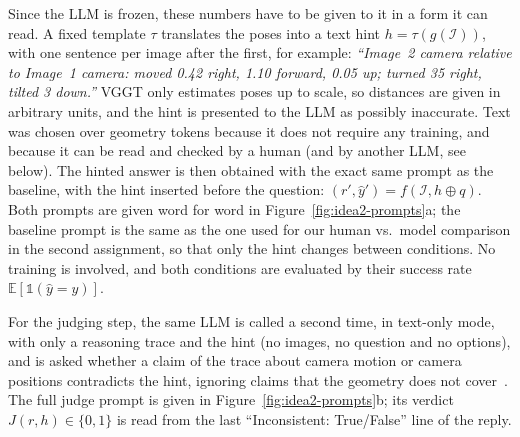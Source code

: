 Since the LLM is frozen, these numbers have to be given to it in a form it can read. A fixed template $\tau$ translates the poses into a text hint $h=\tau(g(\mathcal{I}))$, with one sentence per image after the first, for example: \emph{``Image~2 camera relative to Image~1 camera: moved 0.42 right, 1.10 forward, 0.05 up; turned 35\textdegree{} right, tilted 3\textdegree{} down.''} VGGT only estimates poses up to scale, so distances are given in arbitrary units, and the hint is presented to the LLM as possibly inaccurate. Text was chosen over geometry tokens because it does not require any training, and because it can be read and checked by a human (and by another LLM, see below). The hinted answer is then obtained with the exact same prompt as the baseline, with the hint inserted before the question: $(r',\hat{y}')=f(\mathcal{I},h\oplus q)$. Both prompts are given word for word in Figure~\ref{fig:idea2-prompts}a; the baseline prompt is the same as the one used for our human vs.\ model comparison in the second assignment, so that only the hint changes between conditions. No training is involved, and both conditions are evaluated by their success rate $\mathbb{E}[\mathbb{1}(\hat{y}=y)]$.

For the judging step, the same LLM is called a second time, in text-only mode, with only a reasoning trace and the hint (no images, no question and no options), and is asked whether a claim of the trace about camera motion or camera positions contradicts the hint, ignoring claims that the geometry does not cover~\citep{zheng2023judging}. The full judge prompt is given in Figure~\ref{fig:idea2-prompts}b; its verdict $J(r,h)\in\{0,1\}$ is read from the last ``Inconsistent: True/False'' line of the reply.

